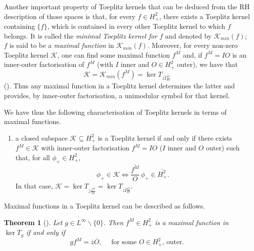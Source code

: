 \documentclass[12pt]{elsarticle}
\numberwithin{equation}{section}
\theoremstyle{plain}
\newtheorem{thm}{Theorem}[section]
\newcommand{\Hp}{\ensuremath{H^2_+}}
\newcommand{\Linf}{\ensuremath{L^\infty}}
\newcommand{\KK}{\ensuremath{\mathcal{K}}}
\newcommand{\KKmin}{\ensuremath{\mathcal{K}_{min}}}
\newcommand{\ol}[1]{\ensuremath{\overline{#1}}}
\newcommand{\bs}{\backslash}
\renewcommand{\subset}{\subseteq}
\begin{document}
Another important property of Toeplitz kernels that can be deduced from the RH description of those spaces is that, for every $f\in\Hp$, there exists a Toeplitz kernel containing $\{ f \}$, which is contained in every other Toeplitz kernel to which $f$ belongs.
It is called the \emph{minimal Toeplitz kernel for $f$} and denoted by $\KKmin (f)$; $f$ is said to be a \emph{maximal function} in $\KKmin (f)$.
Moreover, for every non-zero Toeplitz kernel \KK, one can find some maximal function $f^M$ and, if $f^M = IO$ is an inner-outer factorisation of $f^M$ (with $I$ inner and $O\in\Hp$ outer), we have that
\begin{equation}
\label{eq:f=IO.max.gives.unimodular.symbol}
\KK = \KKmin (f^M) = \ker T_{\ol{zI}\frac{\ol {O}}{O}}
\end{equation}
(\cite[Thm 5.1]{CP14}).
Thus any maximal function in a Toeplitz kernel determines the latter and provides, by inner-outer factorisation, a unimodular symbol for that kernel.

We have thus the following characterisation of Toeplitz kernels in terms of maximal functions.
\begin{enumerate}
\item[(ii)] a closed subspace $\KK \subset \Hp$ is a Toeplitz kernel if and only if there exists $f^M \in \KK$ with inner-outer factorisation $f^M = IO$ ($I$ inner and $O$ outer) such that, for all $\phi_+ \in \Hp$,
\begin{equation*}
\phi_+ \in \KK \iff \frac{\ol{f^M}}{O}\, \phi_+ \in \ol\Hp.
\end{equation*}
In that case, $\KK = \ker T_{\ol{z} \frac{\ol{f^M}}{O}} = \ker T_{\ol{zI}\frac{\ol {O}}{O}}$.
\end{enumerate}

Maximal functions in a Toeplitz kernel can be described as follows.

\begin{thm}[{\cite[Thm 2.2]{CP18_multipliers}}]
\label{thm: maximal function characterization}
Let $g\in \Linf\bs\{0\}$.
Then $f^M \in \Hp$ is a maximal  function in $\ker T_g$ if and only if 
\begin{equation}
\label{eq:maximal_function_characterization}
g f^M = \ol z \ol O , \quad \text{ for some } O \in \Hp \text{, outer}.
\end{equation}
\end{thm}
\end{document}
